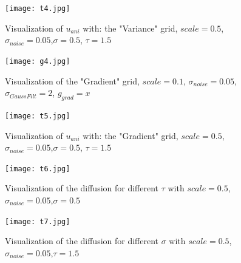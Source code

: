 \documentclass{report}
\begin{document}

\begin{figure}
	\label{t4}
	\centering
	\caption{Visualization of $u_{ani}$ with: the "Variance" grid, $scale=0.5$, $\sigma_{noise}=0.05$,$\sigma=0.5$, $\tau=1.5$}
	\texttt{[image: t4.jpg]}
\end{figure}

        \begin{figure}
        	
        	\centering
        	\caption{Visualization of the "Gradient" grid, $scale=0.1$, $\sigma_{noise}=0.05$, $\sigma_{GaussFilt}=2$,  $g_{grad}=x$}
        	\texttt{[image: g4.jpg]}
        \end{figure}
        
        
        \begin{figure}
        	
        	\centering
        	\caption{Visualization of $u_{ani}$ with: the "Gradient" grid, $scale=0.5$, $\sigma_{noise}=0.05$,$\sigma=0.5$, $\tau=1.5$}
        	\texttt{[image: t5.jpg]}
        \end{figure}


\clearpage

        \begin{figure}
        	\label{t6}
        	\centering
        	\caption{Visualization of the diffusion for different $\tau$ with $scale=0.5$, $\sigma_{noise}=0.05$,$\sigma=0.5$ }
        	\texttt{[image: t6.jpg]}
        \end{figure}

        \begin{figure}
        	\label{t7}
        	\centering
        	\caption{Visualization of the diffusion for different $\sigma$ with $scale=0.5$, $\sigma_{noise}=0.05$,$\tau=1.5$ }
        	\texttt{[image: t7.jpg]}
        \end{figure}
\end{document}
